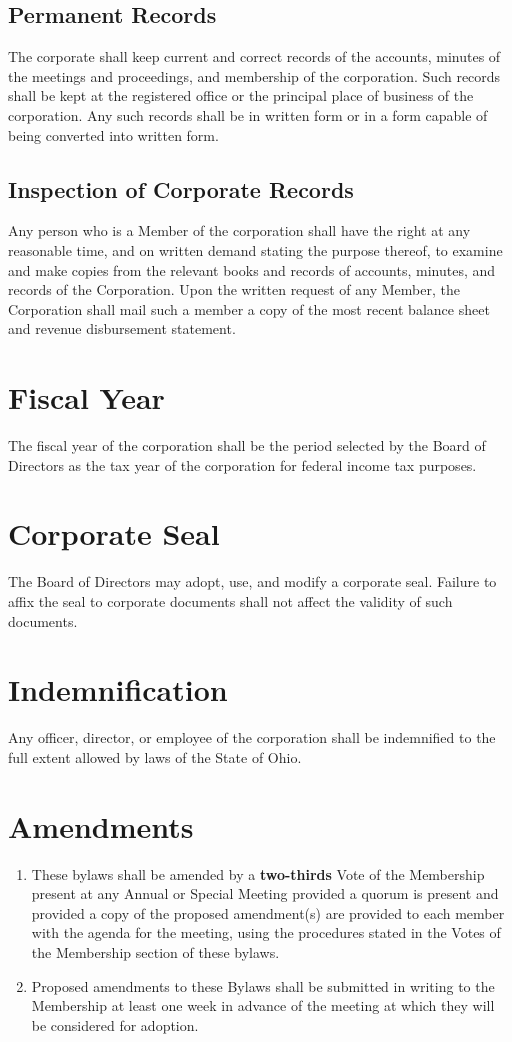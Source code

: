 \documentclass{article}
\begin{document}
\subsection{Permanent Records}
The corporate shall keep current and correct records of the accounts, minutes of the 
meetings and proceedings, and membership of the corporation.  Such records shall be kept 
at the registered office or the principal place of business of the corporation.  Any such 
records shall be in written form or in a form capable of being converted into written form.
\subsection{Inspection of Corporate Records}
Any person who is a Member of the corporation shall have the right at any reasonable time, 
and on written demand stating the purpose thereof, to examine and make copies from the 
relevant books and records of accounts, minutes, and records of the Corporation.  Upon 
the written request of any Member, the Corporation shall mail such a member a copy of the 
most recent balance sheet and revenue disbursement statement.
\section{Fiscal Year}
The fiscal year of the corporation shall be the period selected by the Board of Directors as 
the tax year of the corporation for federal income tax purposes.
\section{Corporate Seal}
The Board of Directors may adopt, use, and modify a corporate seal.  Failure to affix the 
seal to corporate documents shall not affect the validity of such documents.
\section{Indemnification}
Any officer, director, or employee of the corporation shall be indemnified to the full extent 
allowed by laws of the State of Ohio.
\section{Amendments}
\begin{enumerate}
\item These bylaws shall be amended by a \textbf{two-thirds} Vote of the Membership present at 
any Annual or Special Meeting provided a quorum is present and provided a copy 
of the proposed amendment(s) are provided to each member with the agenda for the 
meeting, using the procedures stated in the Votes of the Membership section of these 
bylaws.
\item Proposed amendments to these Bylaws shall be submitted in writing to the 
Membership at least one week in advance of the meeting at which they will be considered 
for adoption.
\end{enumerate}
\end{document}
